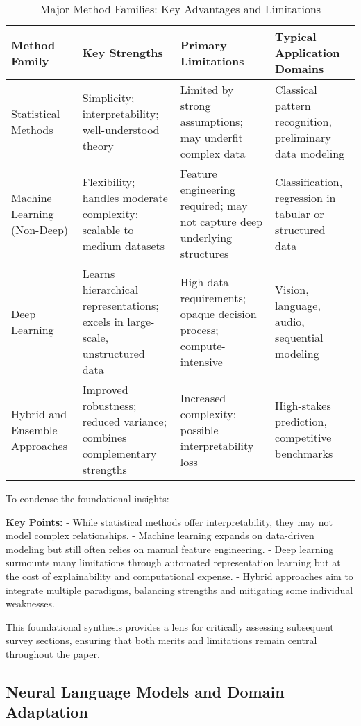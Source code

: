 \documentclass[sigconf]{acmart}
\begin{document}
\begin{table*}[htbp]
\centering
\caption{Major Method Families: Key Advantages and Limitations}
\label{tab:method-families}
\begin{adjustbox}{max width=\textwidth}
\begin{tabular}{@{}llll@{}}
\toprule
Method Family & Key Strengths & Primary Limitations & Typical Application Domains \\
\midrule
Statistical Methods & Simplicity; interpretability; well-understood theory & Limited by strong assumptions; may underfit complex data & Classical pattern recognition, preliminary data modeling \\
Machine Learning (Non-Deep) & Flexibility; handles moderate complexity; scalable to medium datasets & Feature engineering required; may not capture deep underlying structures & Classification, regression in tabular or structured data \\
Deep Learning & Learns hierarchical representations; excels in large-scale, unstructured data & High data requirements; opaque decision process; compute-intensive & Vision, language, audio, sequential modeling \\
Hybrid and Ensemble Approaches & Improved robustness; reduced variance; combines complementary strengths & Increased complexity; possible interpretability loss & High-stakes prediction, competitive benchmarks \\
\bottomrule
\end{tabular}
\end{adjustbox}
\end{table*}

To condense the foundational insights:

\textbf{Key Points:}
- While statistical methods offer interpretability, they may not model complex relationships.
- Machine learning expands on data-driven modeling but still often relies on manual feature engineering.
- Deep learning surmounts many limitations through automated representation learning but at the cost of explainability and computational expense.
- Hybrid approaches aim to integrate multiple paradigms, balancing strengths and mitigating some individual weaknesses.

This foundational synthesis provides a lens for critically assessing subsequent survey sections, ensuring that both merits and limitations remain central throughout the paper.

\subsection{Neural Language Models and Domain Adaptation}
\end{document}
